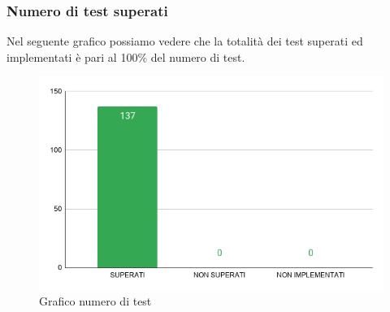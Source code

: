 \subsubsection{Numero di test superati}
Nel seguente grafico possiamo vedere che la totalità dei test superati ed implementati è pari al 100\% del numero di test.
    \begin{figure}[H]
        \centering
        \includegraphics[width=10 cm]{source/sections/images/num-test.png}
        \caption{Grafico numero di test}
    \end{figure}
